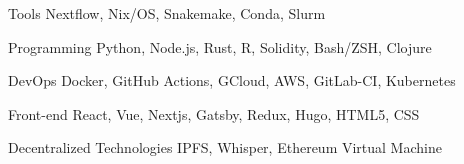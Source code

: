 
\begin{cvskills}

	\cvskill
	{Tools} %
	{Nextflow, Nix/OS, Snakemake, Conda, Slurm} %

	\cvskill
	{Programming} %
	{Python, Node.js, Rust, R, Solidity, Bash/ZSH, Clojure} %

	\cvskill
	{DevOps} %
	{Docker, GitHub Actions, GCloud, AWS, GitLab-CI, Kubernetes} %

	\cvskill
	{Front-end} %
	{React, Vue, Nextjs, Gatsby, Redux, Hugo, HTML5, CSS} %

	\cvskill
	{Decentralized Technologies} %
	{IPFS, Whisper, Ethereum Virtual Machine} %


\end{cvskills}
